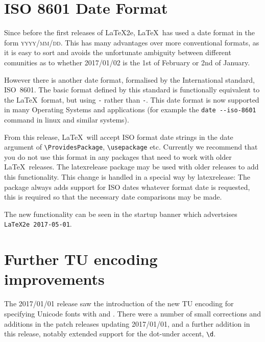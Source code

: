 \documentclass{ltnews}
\begin{document}
\maketitle
\tableofcontents

\setlength{}

\section{ISO 8601 Date Format}
Since before the first releases of \LaTeX2e, \LaTeX\ has used a date
format in the form \textsc{yyyy/mm/dd}. This has many advantages over more
conventional formats, as it is easy to sort and avoids the unfortunate
ambiguity between different comunities as to whether 2017/01/02 is the
1st of February or 2nd of January.

However there is another date format, formalised by the
International standard, ISO~8601. The basic format defined by this
standard is functionally equivalent to the \LaTeX\ format, but using
\texttt{-} rather than \texttt{-}. This date format is now supported
in many Operating Systems and applications
(for example the \verb|date --iso-8601| command in linux and similar systems).

From this release, \LaTeX\ will accept ISO format date strings in the
date argument of \verb|\ProvidesPackage|, \verb|\usepackage| etc.
Currently we recommend that you do not use this format in any packages
that need to work with older \LaTeX\ releases. 
The \textsf{latexrelease} package may be used with older releases to
 add this functionality. This change is handled in a special way  by
 \textsf{latexrelease}: The package always adds support for ISO dates
whatever format date is requested, this is required so that the
necessary date comparisons may be made.

The new functionality can be seen in the startup banner which
advertsises \texttt{LaTeX2e 2017-05-01}.

\section{Further TU encoding improvements}
The 2017/01/01 release saw the introduction of the new TU encoding for
specifying Unicode fonts with  and
. There were a number of small corrections and additions
in the patch releases updating 2017/01/01, and a further addition in
this release, notably extended support for the dot-under accent,
\verb|\d|.
\end{document}

